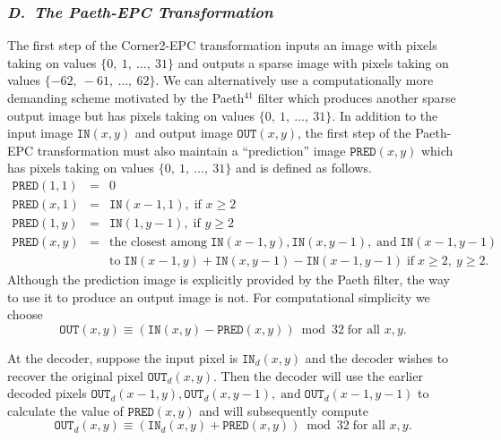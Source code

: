 \documentclass{article}
\begin{document}
\subsubsection*{{\em D.~The Paeth-EPC Transformation}}
The first step of the Corner2-EPC transformation inputs an image with
pixels taking on values $\{0, \ 1, \ \dots , \ 31\}$
and outputs a sparse image with pixels taking on values
$\{-62, \ -61, \ \dots , \ 62\}$.
We can alternatively use a computationally more demanding scheme motivated
by the Paeth$^{41}$ filter which produces another sparse output image but
has pixels taking on values $\{0, \ 1, \ \dots , \ 31\}$.
In addition to the input image $\texttt{IN}(x,y)$ and output image 
$\texttt{OUT}(x,y)$, the first step of the Paeth-EPC transformation
must also maintain a ``prediction'' image $\texttt{PRED}(x,y)$ which
has pixels taking on values $\{0, \ 1, \ \dots , \ 31\}$ and is defined as
follows.
\begin{eqnarray*}
\texttt{PRED}(1,1) & = & 0 \\
\texttt{PRED}(x,1) & = & \texttt{IN}(x-1,1) , \; \mbox{if $x \geq 2$} \\
\texttt{PRED}(1,y) & = & \texttt{IN}(1,y-1) , \; \mbox{if $y \geq 2$} \\
\texttt{PRED}(x,y) & = & \mbox{the closest among} \;  
\texttt{IN}(x-1,y), \texttt{IN}(x,y-1), \; \mbox{and} \; \texttt{IN}(x-1,y-1) 
\\ & & \mbox{to} \; 
\texttt{IN}(x-1,y) + \texttt{IN}(x,y-1) - \texttt{IN}(x-1,y-1) 
\; \mbox{if} \; x \geq 2, \ y \geq 2.
\end{eqnarray*}
Although the prediction image is explicitly provided by the Paeth filter,
the way to use it to produce an output image is not.  For computational
simplicity we choose
\begin{displaymath}
\texttt{OUT}(x,y) \equiv (\texttt{IN}(x,y) - \texttt{PRED}(x,y)) \bmod 32 \;
\mbox{for all $x,y$}.
\end{displaymath}

At the decoder, suppose the input pixel is $\texttt{IN}_d (x,y)$
and the decoder wishes to recover the original pixel  $\texttt{OUT}_d (x,y)$.
Then the decoder will use the earlier decoded pixels $\texttt{OUT}_d (x-1,y),
\texttt{OUT}_d (x,y-1), \; \mbox{and} \; \texttt{OUT}_d (x-1,y-1)$ to
calculate the value of $\texttt{PRED}(x,y)$ and will subsequently compute
\begin{displaymath}
\texttt{OUT}_d (x,y) \equiv (\texttt{IN}_d (x,y) + \texttt{PRED}(x,y)) 
\bmod 32 \; \mbox{for all $x,y$}.
\end{displaymath}
\end{document}
